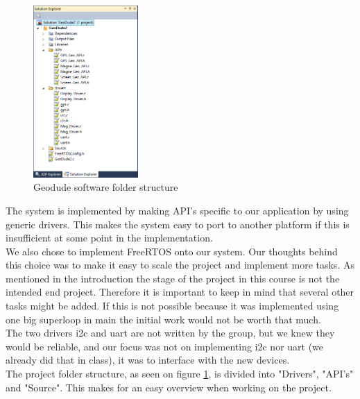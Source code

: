 \begin{figure}
\vspace{-30pt}
\begin{center}
\includegraphics[width=4cm]{billeder/folder_structure}
\end{center}
\vspace{-20pt}
\caption{Geodude software folder structure}
\vspace{-20pt}
\label{fig:fold_structure}
\end{figure}
The system is implemented by making API's specific to our application by using generic drivers. This makes the system easy to port to another platform if this is insufficient at some point in the implementation.\\
We also chose to implement FreeRTOS onto our system. Our thoughts behind this choice was to make it easy to scale the project and implement more tasks. As mentioned in the introduction the stage of the project in this course is not the intended end project. Therefore it is important to keep in mind that several other tasks might be added. If this is not possible because it was implemented using one big superloop in main the initial work would not be worth that much.\\
The two drivers i2c and uart are not written by the group, but we knew they would be reliable, and our focus was not on implementing i2c nor uart (we already did that in class), it was to interface with the new devices.\\
The project folder structure, as seen on figure \ref{fig:fold_structure}, is divided into "Drivers", "API's" and "Source". This makes for an easy overview when working on the project.\\

